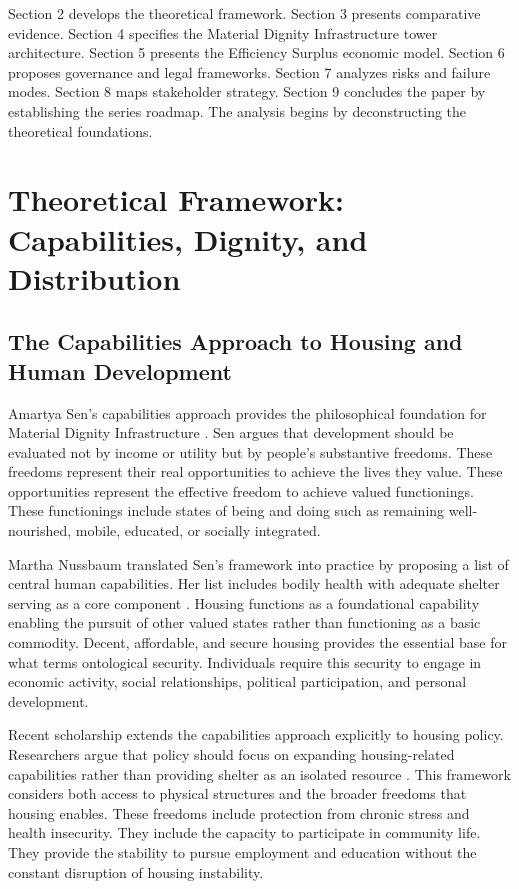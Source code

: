 \documentclass[12pt, letterpaper]{article}
\begin{document}
Section 2 develops the theoretical framework. Section 3 presents comparative evidence. Section 4 specifies the Material Dignity Infrastructure tower architecture. Section 5 presents the Efficiency Surplus economic model. Section 6 proposes governance and legal frameworks. Section 7 analyzes risks and failure modes. Section 8 maps stakeholder strategy. Section 9 concludes the paper by establishing the series roadmap. The analysis begins by deconstructing the theoretical foundations.

\newpage

\section{Theoretical Framework: Capabilities, Dignity, and Distribution}

\subsection{The Capabilities Approach to Housing and Human Development}

Amartya Sen's capabilities approach provides the philosophical foundation for Material Dignity Infrastructure \citep{sen_1999}. Sen argues that development should be evaluated not by income or utility but by people's substantive freedoms. These freedoms represent their real opportunities to achieve the lives they value. These opportunities represent the effective freedom to achieve valued functionings. These functionings include states of being and doing such as remaining well-nourished, mobile, educated, or socially integrated.

Martha Nussbaum translated Sen's framework into practice by proposing a list of central human capabilities. Her list includes bodily health with adequate shelter serving as a core component \citep{nussbaum_2011}. Housing functions as a foundational capability enabling the pursuit of other valued states rather than functioning as a basic commodity. Decent, affordable, and secure housing provides the essential base for what \citet{saunders_1989} terms ontological security. Individuals require this security to engage in economic activity, social relationships, political participation, and personal development.

Recent scholarship extends the capabilities approach explicitly to housing policy. Researchers argue that policy should focus on expanding housing-related capabilities rather than providing shelter as an isolated resource \citep{cambridge_2019}. This framework considers both access to physical structures and the broader freedoms that housing enables. These freedoms include protection from chronic stress and health insecurity. They include the capacity to participate in community life. They provide the stability to pursue employment and education without the constant disruption of housing instability.
\end{document}

